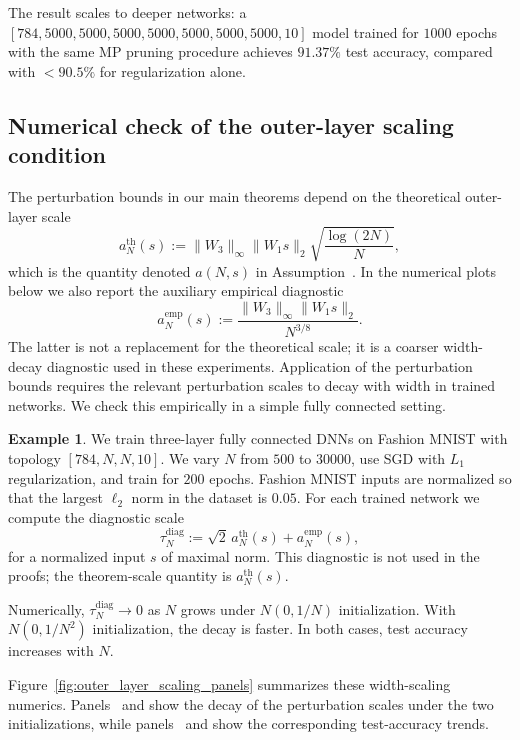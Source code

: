 \documentclass[11pt]{article}
\makeatletter
\theoremstyle{plain}
\theoremstyle{definition}
\newtheorem{ex}[thm]{Example}
\theoremstyle{remark}
\newcommand{\1}{\mathbf{1}}
\newcommand{\mainref}[1]{\@ifundefined{r@main-#1}{\@ifundefined{r@#1}{\ref*{orone-#1}}{\ref{#1}}}{\ref*{main-#1}}}
\makeatother
\begin{document}
The result scales to deeper networks: a \([784,5000,5000,5000,5000,5000,5000,5000,10]\) model trained for \(1000\) epochs with the same MP pruning procedure achieves \(91.37\%\) test accuracy, compared with \(<90.5\%\) for regularization alone.

\subsection{Numerical check of the outer-layer scaling condition}
\label{app:outer_layer_scaling}

The perturbation bounds in our main theorems depend on the theoretical outer-layer scale
\[
a_N^{\mathrm{th}}(s)
:=
\|W_3\|_\infty\|W_1s\|_2\sqrt{\frac{\log(2N)}{N}},
\]
which is the quantity denoted \(a(N,s)\) in Assumption~\mainref{as1}. In the numerical plots below we also report the auxiliary empirical diagnostic
\[
a_N^{\mathrm{emp}}(s)
:=
\frac{\|W_3\|_\infty\|W_1s\|_2}{N^{3/8}}.
\]
The latter is not a replacement for the theoretical scale; it is a coarser width-decay diagnostic used in these experiments. Application of the perturbation bounds requires the relevant perturbation scales to decay with width in trained networks. We check this empirically in a simple fully connected setting.

\begin{ex}
\label{ex:outer_layer_scaling}
We train three-layer fully connected DNNs on Fashion MNIST with topology \([784,N,N,10]\).  We vary \(N\) from \(500\) to \(30000\), use SGD with \(L_1\) regularization, and train for \(200\) epochs. Fashion MNIST inputs are normalized so that the largest \(\ell_2\) norm in the dataset is \(0.05\). For each trained network we compute the diagnostic scale
\[
\tau_N^{\mathrm{diag}}
:=
\sqrt2\,a_N^{\mathrm{th}}(s)
+
a_N^{\mathrm{emp}}(s),
\]
for a normalized input \(s\) of maximal norm. This diagnostic is not used in the proofs; the theorem-scale quantity is \(a_N^{\mathrm{th}}(s)\).

Numerically, \(\tau_N^{\mathrm{diag}}\to0\) as \(N\) grows under \(N(0,1/N)\) initialization. With \(N(0,1/N^2)\) initialization, the decay is faster. In both cases, test accuracy increases with \(N\).
\end{ex}

Figure~\ref{fig:outer_layer_scaling_panels} summarizes these width-scaling numerics. Panels~ and  show the decay of the perturbation scales under the two initializations, while panels~ and  show the corresponding test-accuracy trends.
\end{document}
